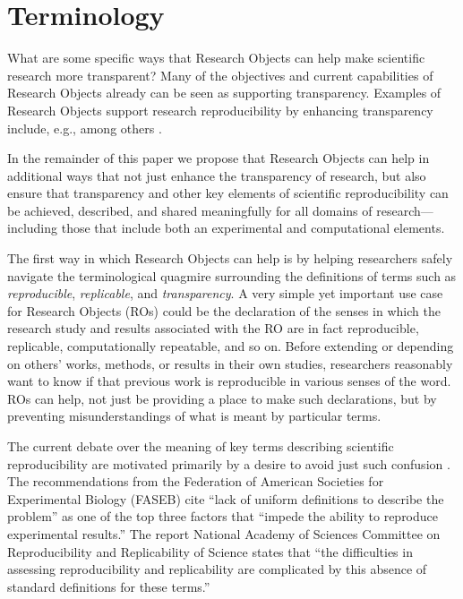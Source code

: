\section{Terminology}\label{sec-terminology}

What are some specific ways that Research Objects \cite{bechhofer2013whya} can help make scientific research more transparent?  Many of the objectives and current capabilities of Research Objects already can be seen as supporting
	transparency.
Examples of Research Objects support research reproducibility by enhancing transparency include, e.g., \cite{mecum2018preservingc} among others
\cite{DBLP:conf/eScience/2018}. 


In the remainder of this paper we propose that Research Objects can help in additional ways that not
	just enhance the transparency of research, but also ensure that transparency and other key elements
	of scientific reproducibility can be achieved, described, and shared meaningfully for all domains
	of research---including those that include both an experimental and computational elements.

The first way in which Research Objects can help is by helping researchers safely navigate the 
	terminological quagmire surrounding the definitions of terms such as \emph{reproducible},
	\emph{replicable}, and \emph{transparency}.
A very simple yet important use case for Research Objects (ROs) could be the declaration of the senses in
	which the research study and results associated with the RO are in fact reproducible, replicable,
	computationally repeatable, and so on.
Before extending or depending on others' works, methods, or results in their own studies, researchers
	reasonably want to know if that previous work is reproducible in various senses of the word.
ROs can help, not just be providing a place to make such declarations, but by preventing
	misunderstandings of what is meant by particular terms.

The current debate over the meaning of key terms describing 
	scientific reproducibility are motivated primarily by a desire to avoid just such confusion \cite{drummond2009replicability,goodman2016what,rauber16primad,herouxtoward,plesser2018reproducibility,barba2018terminologies,committeeonreproducibilityandreplicabilityinscience2019reproducibility}.
The recommendations from the Federation of
American Societies for Experimental Biology (FASEB) \cite{FASEB2016enhancing} cite ``lack of uniform definitions to describe the problem''
	as one of the top three factors that ``impede the ability to reproduce experimental results.''
 The report National Academy of Sciences Committee on Reproducibility and Replicability of Science \cite{committeeonreproducibilityandreplicabilityinscience2019reproducibility} states
	that ``the difficulties in assessing reproducibility and replicability are complicated by this absence of
	standard definitions for these terms.''

